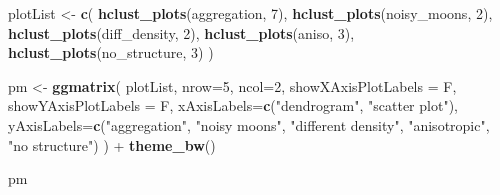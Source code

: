 \documentclass[]{book}
\newenvironment{Shaded}{\begin{snugshade}}{\end{snugshade}}
\newcommand{\KeywordTok}[1]{\textcolor[rgb]{0.13,0.29,0.53}{\textbf{{#1}}}}
\newcommand{\DataTypeTok}[1]{\textcolor[rgb]{0.13,0.29,0.53}{{#1}}}
\newcommand{\DecValTok}[1]{\textcolor[rgb]{0.00,0.00,0.81}{{#1}}}
\newcommand{\StringTok}[1]{\textcolor[rgb]{0.31,0.60,0.02}{{#1}}}
\newcommand{\NormalTok}[1]{{#1}}
\theoremstyle{definition}
\theoremstyle{definition}
\theoremstyle{definition}
\theoremstyle{remark}
\begin{document}
\begin{Shaded}
\begin{Highlighting}[]
\NormalTok{plotList <-}\StringTok{ }\KeywordTok{c}\NormalTok{(}
  \KeywordTok{hclust_plots}\NormalTok{(aggregation, }\DecValTok{7}\NormalTok{),}
  \KeywordTok{hclust_plots}\NormalTok{(noisy_moons, }\DecValTok{2}\NormalTok{),}
  \KeywordTok{hclust_plots}\NormalTok{(diff_density, }\DecValTok{2}\NormalTok{),}
  \KeywordTok{hclust_plots}\NormalTok{(aniso, }\DecValTok{3}\NormalTok{),}
  \KeywordTok{hclust_plots}\NormalTok{(no_structure, }\DecValTok{3}\NormalTok{)}
\NormalTok{)}

\NormalTok{pm <-}\StringTok{ }\KeywordTok{ggmatrix}\NormalTok{(}
  \NormalTok{plotList, }\DataTypeTok{nrow=}\DecValTok{5}\NormalTok{, }\DataTypeTok{ncol=}\DecValTok{2}\NormalTok{, }\DataTypeTok{showXAxisPlotLabels =} \NormalTok{F, }\DataTypeTok{showYAxisPlotLabels =} \NormalTok{F,}
  \DataTypeTok{xAxisLabels=}\KeywordTok{c}\NormalTok{(}\StringTok{"dendrogram"}\NormalTok{, }\StringTok{"scatter plot"}\NormalTok{), }
  \DataTypeTok{yAxisLabels=}\KeywordTok{c}\NormalTok{(}\StringTok{"aggregation"}\NormalTok{, }\StringTok{"noisy moons"}\NormalTok{, }\StringTok{"different density"}\NormalTok{, }\StringTok{"anisotropic"}\NormalTok{, }\StringTok{"no structure"}\NormalTok{)}
\NormalTok{) +}\StringTok{ }\KeywordTok{theme_bw}\NormalTok{()}

\NormalTok{pm}
\end{Highlighting}
\end{Shaded}
\end{document}
